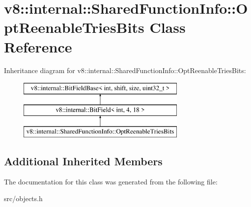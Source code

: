 \hypertarget{classv8_1_1internal_1_1_shared_function_info_1_1_opt_reenable_tries_bits}{}\section{v8\+:\+:internal\+:\+:Shared\+Function\+Info\+:\+:Opt\+Reenable\+Tries\+Bits Class Reference}
\label{classv8_1_1internal_1_1_shared_function_info_1_1_opt_reenable_tries_bits}
Inheritance diagram for v8\+:\+:internal\+:\+:Shared\+Function\+Info\+:\+:Opt\+Reenable\+Tries\+Bits\+:\begin{figure}[H]
\begin{center}
\leavevmode
\includegraphics[height=3.000000cm]{classv8_1_1internal_1_1_shared_function_info_1_1_opt_reenable_tries_bits}
\end{center}
\end{figure}
\subsection*{Additional Inherited Members}


The documentation for this class was generated from the following file\+:\begin{DoxyCompactItemize}
\item 
src/objects.\+h\end{DoxyCompactItemize}
